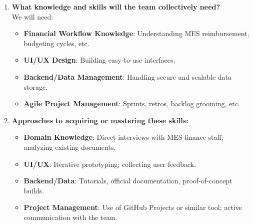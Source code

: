 \documentclass[12pt]{article}
\begin{document}
\begin{enumerate}
  \item \textbf{What knowledge and skills will the team collectively need?} \\
  We will need:
  \begin{itemize}
    \item \textbf{Financial Workflow Knowledge}: Understanding MES reimbursement, budgeting cycles, etc.
    \item \textbf{UI/UX Design}: Building easy-to-use interfaces.
    \item \textbf{Backend/Data Management}: Handling secure and scalable data storage.
    \item \textbf{Agile Project Management}: Sprints, retros, backlog grooming, etc.
  \end{itemize}

  \item \textbf{Approaches to acquiring or mastering these skills:} \\
  \begin{itemize}
    \item \textbf{Domain Knowledge}: Direct interviews with MES finance staff; analyzing existing documents.
    \item \textbf{UI/UX}: Iterative prototyping; collecting user feedback.
    \item \textbf{Backend/Data}: Tutorials, official documentation, proof-of-concept builds.
    \item \textbf{Project Management}: Use of GitHub Projects or similar tool; active communication with the team.
  \end{itemize}
\end{enumerate}
\end{document}
